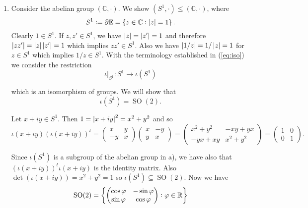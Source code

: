 \begin{enumerate}[label = \textbf{Exercise \arabic*.},wide = 0pt, itemsep=1.5ex]
\begin{enumerate}[label = \alph*),wide = 0pt, itemsep=1.5ex]
\item Consider the abelian group $(\mathbb{C},\cdot)$. We show $(S^1, \cdot) \leq (\mathbb{C},\cdot)$, where
	\begin{equation*}
		S^1 := \partial\mathbb{E} = \cbr[0]{z \in \mathbb{C} : \abs[0]{z} = 1}.
	\end{equation*}
	Clearly $1 \in S^1$. If $z,z' \in S^1$, we have $\abs[0]{z} = \abs[0]{z'} = 1$ and therefore $\abs[0]{zz'} = \abs[0]{z}\abs[0]{z'} = 1$ which implies $zz' \in S^1$. Also we have $\abs[0]{1/z} = 1/\abs[0]{z} = 1$ for $z \in S^1$ which implies $1/z \in S^1$. With the terminology established in (\ref{eq:iso}) we consider the restriction
	\begin{equation}
		\iota\vert_{S^1}: S^1 \to \iota(S^1)
	\end{equation}

	\noindent which is an isomorphism of groups. We will show that 
	\begin{equation}
		\iota(S^1) = \operatorname{SO}(2).
	\end{equation}

	Let $x + iy \in S^1$. Then $1 = \abs[0]{x + iy}^2 = x^2 + y^2$ and so
	\begin{equation*}
		\iota(x + iy)(\iota(x + iy))^t = \begin{pmatrix}
		x & y\\
		-y & x
	\end{pmatrix}\begin{pmatrix}
		x & -y\\
		y & x
	\end{pmatrix} = \begin{pmatrix}
		x^2 + y^2 & -xy + yx\\
		-yx + xy & x^2 + y^2
	\end{pmatrix} = \begin{pmatrix}
		1 & 0\\
		0 & 1
	\end{pmatrix}.
	\end{equation*}

	Since $\iota(S^1)$ is a subgroup of the abelian group in a), we have also that $(\iota(x + iy))^t\iota(x + iy)$ is the identity matrix. Also $\det(\iota(x + iy)) = x^2 + y^2 = 1$ so $\iota(S^1) \subseteq \operatorname{SO}(2)$. Now we have 
	\begin{equation*}
		\operatorname{SO}(2) = \cbr[3]{\begin{pmatrix}
		\cos \varphi & -\sin \varphi\\
		\sin\varphi & \cos \varphi
	\end{pmatrix} : \varphi \in \mathbb{R}}
	\end{equation*}


\end{enumerate}
\end{enumerate}
